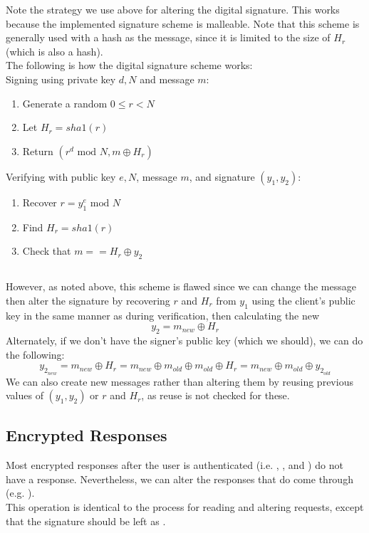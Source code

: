 \documentclass{article}
\newcommand{\code}[1]{\tcbox[
    on line,
    colback=codebackground, boxsep=2pt,
    colframe=white, boxrule=0pt,
    top=0pt, bottom=0pt, left=0pt, right=0pt
]{\texttt{#1}}}
\begin{document}
Note the strategy we use above for altering the digital signature.
This works because the implemented signature scheme is malleable.
Note that this scheme is generally used with a hash as the message,
since it is limited to the size of $H_r$ (which is also a hash). \\
The following is how the digital signature scheme works: \\
Signing using private key $d, N$ and message $m$:
\begin{enumerate}
    \item Generate a random $0 \leq r < N$
    \item Let $H_r = sha1(r)$
    \item Return $(r^d\text{ mod }N, m \oplus H_r)$
\end{enumerate}
Verifying with public key $e, N$, message $m$, and signature $(y_1, y_2)$:
\begin{enumerate}
    \item Recover $r = y_1^e\text{ mod }N$
    \item Find $H_r = sha1(r)$
    \item Check that $m == H_r \oplus y_2$
\end{enumerate}
\subsection*{}
\label{sec:signaturebad}
However, as noted above, this scheme is flawed since we can change the message then alter the signature by recovering
$r$ and $H_r$ from $y_1$ using the client's public key in the same manner as during verification, then calculating the new
\[y_2 = m_{new} \oplus H_r\]
Alternately, if we don't have the signer's public key (which we should), we can do the following:
\[y_{2_{new}} = m_{new} \oplus H_r = m_{new} \oplus m_{old} \oplus m_{old} \oplus H_r = m_{new} \oplus m_{old} \oplus y_{2_{old}}\]
We can also create new messages rather than altering them by reusing previous values of $(y_1, y_2)$ or $r$ and $H_r$, as reuse is not checked for these.

\subsection{Encrypted Responses}
Most encrypted responses after the user is authenticated (i.e. \code{DEPOSIT}, \code{WITHDRAW}, and \code{FREEZE}) do not have a response.
Nevertheless, we can alter the responses that do come through (e.g. \code{CHECK}). \\
This operation is identical to the process for reading and altering requests, except that the signature should be left as \code{null}.
\end{document}
